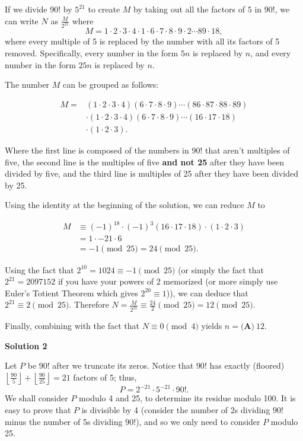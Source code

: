 \begin{enumerate}
 If we divide $90!$ by $5^{21}$ to create $M$ by taking out all the factors of $5$ in $90!$, we can write $N$ as $\frac M{2^{21}}$ where
 \[M=1\cdot 2\cdot 3\cdot 4\cdot 1\cdot 6\cdot 7\cdot 8\cdot 9\cdot 2\cdots 89\cdot 18,\]where every multiple of 5 is replaced by the number with all its factors of 5 removed. Specifically, every number in the form $5n$ is replaced by $n$, and every number in the form $25n$ is replaced by $n$.

 The number $M$ can be grouped as follows:

 
 \begin{align*}M= &(1\cdot 2\cdot 3\cdot 4)(6\cdot 7\cdot 8\cdot 9)\cdots(86\cdot 87\cdot 88\cdot 89)\\ &\cdot (1\cdot 2\cdot 3\cdot 4)(6\cdot 7\cdot 8\cdot 9)\cdots (16\cdot 17\cdot 18) \\ &\cdot (1\cdot 2\cdot 3).\end{align*}


 Where the first line is composed of the numbers in $90!$ that aren't multiples of five, the second line is the multiples of five \textbf{and not 25} after they have been divided by five, and the third line is multiples of 25 after they have been divided by 25.

 Using the identity at the beginning of the solution, we can reduce $M$ to

 
 \begin{align*}M&\equiv(-1)^{18} \cdot (-1)^3(16\cdot 17\cdot 18) \cdot (1\cdot 2\cdot 3) \\ &= 1\cdot -21\cdot 6\\ &= -1\pmod{25} =24\pmod{25}.\end{align*}


 Using the fact that $2^{10}=1024\equiv -1\pmod{25}$ (or simply the fact that $2^{21}=2097152$ if you have your powers of 2 memorized (or more simply use Euler's Totient Theorem which gives $2^{20}\equiv1$)), we can deduce that $2^{21}\equiv 2\pmod{25}$. Therefore $N=\frac M{2^{21}}\equiv \frac {24}2\pmod{25}=12\pmod{25}$.

 Finally, combining with the fact that $N\equiv 0\pmod 4$ yields $n=\boxed{\textbf{(A)}\ 12}$.

 



\textbf{Solution 2}

Let $P$ be $90!$ after we truncate its zeros. Notice that $90!$ has exactly (floored) $\left\lfloor\frac{90}{5}\right\rfloor + \left\lfloor\frac{90}{25}\right\rfloor = 21$ factors of 5; thus, 
 \[P = 2^{-21}\cdot 5^{-21}\cdot 90!.\] We shall consider $P$ modulo 4 and 25, to determine its residue modulo 100. It is easy to prove that $P$ is divisible by 4 (consider the number of 2s dividing $90!$ minus the number of 5s dividing $90!$), and so we only need to consider $P$ modulo 25.


\end{enumerate}
